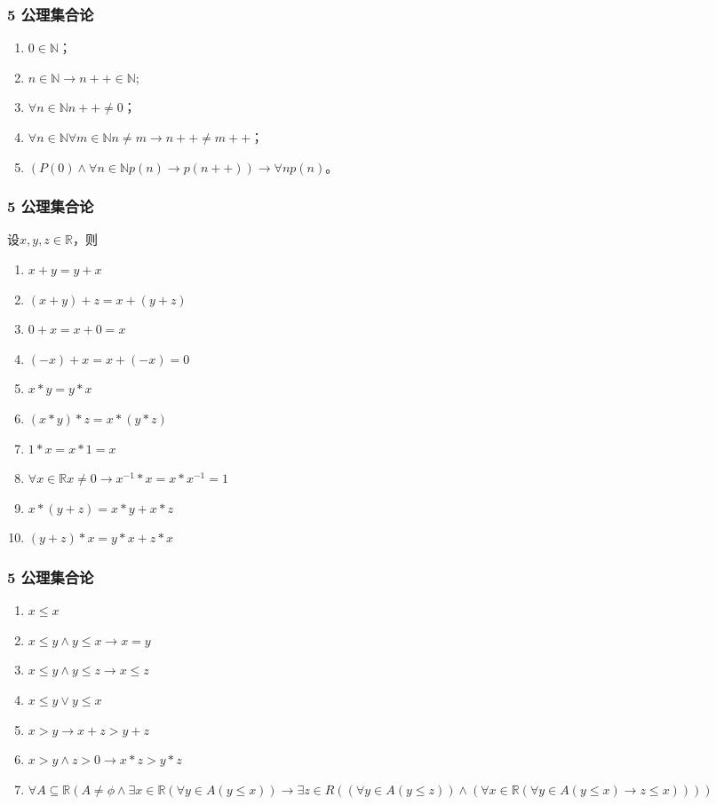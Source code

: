 \documentclass{beamer}
\begin{document}
\begin{CJK*}{UTF8}{gbsn}
\begin{frame}
  \frametitle{5 公理集合论}
  \begin{enumerate}
  \item $0 \in \mathbb{N}$；
  \item $n \in \mathbb{N} \rightarrow n ++ \in \mathbb{N}$;
  \item $\forall n \in \mathbb{N} n ++ \neq 0$；
  \item $\forall n \in \mathbb{N} \forall m \in \mathbb{N} n \neq m \rightarrow n ++ \neq m ++$；
    \item $(P(0) \land \forall n \in \mathbb{N} p(n) \rightarrow p(n++) )\rightarrow \forall n p(n)$。 
  \end{enumerate}
\end{frame}
\begin{frame}
  \frametitle{5 公理集合论}
   设$x, y, z \in \mathbb{R}$，则
   \begin{enumerate}
   \item   $x + y = y + x$
   \item   $(x + y) + z = x + (y + z)$
   \item   $0 + x = x + 0 = x$
   \item   $(-x) + x = x + (-x) = 0$
   \item   $x * y = y * x$
   \item   $(x * y) * z = x * (y *z)$
   \item   $1 * x = x * 1 = x$
   \item   $\forall x \in \mathbb{R} x \neq 0 \to x^{-1} * x = x * x^{-1} = 1$
   \item   $x* (y + z) = x * y + x * z$
   \item   $(y + z) * x = y * x + z * x$
   
    \end{enumerate}
  \end{frame}
  \begin{frame}
  \frametitle{5 公理集合论}
    \begin{enumerate}
       \item $x \leq x$
   \item $ x \leq y \land y \leq x \rightarrow x = y$
   \item $x \leq y \land y \leq z \rightarrow x \leq z$
   \item $x \leq y \lor y \leq x$ 
\item $x > y \rightarrow x + z > y + z$
\item $x > y \land z >0 \rightarrow x * z > y * z$
\item   $\forall A \subseteq \mathbb{R} (A \neq \phi \land \exists x \in \mathbb{R} (\forall y \in A (y \leq x)) \rightarrow \exists z \in R ((\forall y \in A (y \leq z) )\land ( \forall x \in \mathbb{R} (\forall y \in A (y \leq x) \rightarrow z \leq x))))$
\end{enumerate}
\end{frame}

\end{CJK*}
\end{document}

